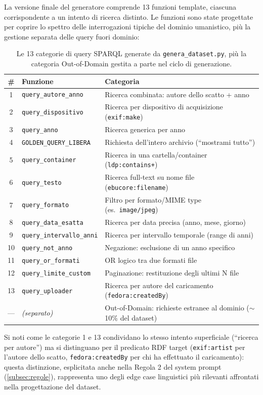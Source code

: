 \documentclass[12pt,a4paper,oneside]{book}
\newcommand{\code}[1]{\colorbox{light-gray}{\texttt{#1}}}
\begin{document}
La versione finale del generatore comprende 13 funzioni template, ciascuna corrispondente a un intento di ricerca distinto. Le funzioni sono state progettate per coprire lo spettro delle interrogazioni tipiche del dominio umanistico, più la gestione separata delle query fuori dominio:

\begin{table}[htbp]
    \centering
    \begin{tabularx}{\textwidth}{cl>{\raggedright\arraybackslash}X}
        \toprule
        \textbf{\#} & \textbf{Funzione} & \textbf{Categoria} \\
        \midrule
        1  & \code{query\_autore\_anno}    & Ricerca combinata: autore dello scatto + anno \\
        2  & \code{query\_dispositivo}     & Ricerca per dispositivo di acquisizione (\code{exif:make}) \\
        3  & \code{query\_anno}            & Ricerca generica per anno \\
        4  & \code{GOLDEN\_QUERY\_LIBERA}  & Richiesta dell'intero archivio (``mostrami tutto'') \\
        5  & \code{query\_container}       & Ricerca in una cartella/container (\code{ldp:contains+}) \\
        6  & \code{query\_testo}           & Ricerca full-text su nome file (\code{ebucore:filename}) \\
        7  & \code{query\_formato}         & Filtro per formato/MIME type (es.\ \code{image/jpeg}) \\
        8  & \code{query\_data\_esatta}    & Ricerca per data precisa (anno, mese, giorno) \\
        9  & \code{query\_intervallo\_anni} & Ricerca per intervallo temporale (range di anni) \\
        10 & \code{query\_not\_anno}       & Negazione: esclusione di un anno specifico \\
        11 & \code{query\_or\_formati}     & OR logico tra due formati file \\
        12 & \code{query\_limite\_custom}  & Paginazione: restituzione degli ultimi N file \\
        13 & \code{query\_uploader}        & Ricerca per autore del caricamento (\code{fedora:createdBy}) \\
        \midrule
        --- & \textit{(separato)} & Out-of-Domain: richieste estranee al dominio ($\sim$10\% del dataset) \\
        \bottomrule
    \end{tabularx}
    \caption{Le 13 categorie di query SPARQL generate da \code{genera\_dataset.py}, più la categoria Out-of-Domain gestita a parte nel ciclo di generazione.}\label{tab:categorie_template}
\end{table}
Si noti come le categorie 1 e 13 condividano lo stesso intento superficiale (``ricerca per autore'') ma si distinguano per il predicato RDF target (\code{exif:artist} per l'autore dello scatto, \code{fedora:createdBy} per chi ha effettuato il caricamento): questa distinzione, esplicitata anche nella Regola 2 del system prompt (\cref{subsec:regole}), rappresenta uno degli edge case linguistici più rilevanti affrontati nella progettazione del dataset.
\end{document}
